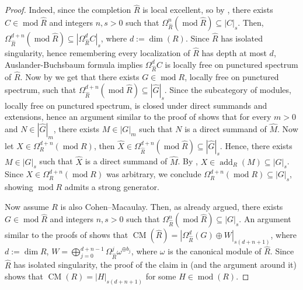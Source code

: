 \documentclass[11pt]{amsart}
\theoremstyle{plain}
\theoremstyle{definition}
\numberwithin{equation}{section}
\numberwithin{theorem}{section}
\begin{document}
\begin{proof} 
    Indeed, since the completion $\widehat R$ is local excellent, so by , there exists $C\in \operatorname{mod } \widehat R$ and integers $n,s>0$ such that $\Omega^n_{\widehat R}(\operatorname{ mod } \widehat R)\subseteq |C|_s$. Then, $\Omega^{d+n}_{\widehat R}(\operatorname{mod} \widehat R)\subseteq |\Omega^d_{\widehat R} C|_s$, where $d:=\dim(R)$. Since $\widehat R$ has isolated singularity, hence remembering every localization of $\widehat R$ has depth at most $d$, Auslander-Buchsbaum formula implies $\Omega^d_{\widehat R} C$ is locally free on punctured spectrum of $\widehat R$. Now by \cite[Corollary 4.4]{BHST:2016} we get that there exists $G\in \operatorname{mod} R$, locally free on punctured spectrum, such that $\Omega^{d+n}_{\widehat R}(\operatorname{mod} \widehat R)\subseteq |\widehat G|_s$. Since the subcategory of modules, locally free on punctured spectrum, is closed under direct summands and extensions, hence an argument similar to the proof of \cite[Theorem 5.11(2)]{Dao/Takahashi:2014} shows that for every $m>0$ and $N\in |\widehat G|_m$, there exists $M\in |G|_m$ such that $N$ is a direct summand of $\widehat M$. Now let $X\in \Omega^{d+n}_{ R}(\operatorname{mod}  R)$, then $\widehat X\in \Omega^{d+n}_{\widehat R}(\operatorname{mod} \widehat R)\subseteq |\widehat G|_s$. Hence, there exists $M\in |G|_s$ such that $\widehat X$ is a direct summand of $\widehat M$. By \cite[Lemma 5.7]{Aihara/Takahashi:2015}, $X\in \operatorname{add}_R(M)\subseteq |G|_s$. Since $X\in \Omega^{d+n}_{ R}(\operatorname{mod}  R)$ was arbitrary, we conclude $\Omega^{d+n}_{ R}(\operatorname{mod}  R)\subseteq |G|_s$, showing $\operatorname{mod} R$ admits a strong generator. 


    Now assume $R$ is also Cohen--Macaulay. Then, as already argued, there exists $G\in \operatorname{mod } \widehat R$ and integers $n,s>0$ such that $\Omega^n_{\widehat R}(\operatorname{ mod } \widehat R)\subseteq |G|_s$. An argument similar to the proofs of \cite[Corollary 5.9, Proposition 5.10]{Dao/Takahashi:2014} shows that $\operatorname{CM}(\widehat R)=|\Omega^d_{\widehat R}(G)\oplus W|_{s(d+n+1)}$, where $d:=\dim R$,  $W=\bigoplus_{j=0}^{d+n-1} \Omega^j_{\widehat R}\omega^{\oplus b_j}$, where $\omega$ is the canonical module of $\widehat R$. Since $\widehat R$ has isolated singularity,  the proof of the claim in \cite[Theorem 5.11(2)]{Dao/Takahashi:2014} (and the argument around it) shows that $\operatorname{CM}(R)=|H|_{s(d+n+1)}$ for some $H\in \operatorname{mod }(R)$.  
\end{proof}
\end{document}

